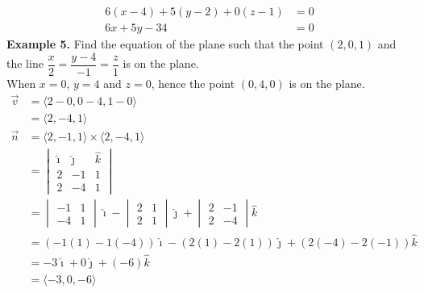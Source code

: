 \vspace{-3.5em}
\begin{align*}
    6(x - 4) + 5(y - 2) + 0(z - 1) & = 0 \\
    6x + 5y - 34                   & = 0
\end{align*}
\noindent\textbf{Example 5. } Find the equation of the plane such that the point $(2, 0, 1)$ and the line $\dfrac{x}{2} = \dfrac{y-4}{-1} = \dfrac{z}{1}$ is on the plane.
~\\
When $x = 0$, $y = 4$ and $z = 0$, hence the point $(0, 4, 0)$ is on the plane.
\begin{align*}
    \vec{v} & = \langle 2 - 0, 0 - 4, 1 - 0 \rangle                                              \\
            & = \langle 2, -4, 1 \rangle                                                         \\
    \vec{n} & = \langle 2, -1, 1 \rangle \times \langle 2, -4, 1 \rangle                         \\
            & = \begin{vmatrix}
                    \hat{\imath} & \hat{\jmath} & \hat{k} \\
                    2            & -1           & 1       \\
                    2            & -4           & 1
                \end{vmatrix}                        \\
            & = \begin{vmatrix}
                    -1 & 1 \\
                    -4 & 1
                \end{vmatrix}\hat{\imath} - \begin{vmatrix}
                                                2 & 1 \\
                                                2 & 1
                                            \end{vmatrix}\hat{\jmath} + \begin{vmatrix}
                                                                            2 & -1 \\
                                                                            2 & -4
                                                                        \end{vmatrix}\hat{k}     \\
            & = (-1(1) - 1(-4))\hat{\imath} - (2(1) - 2(1))\hat{\jmath} + (2(-4) - 2(-1))\hat{k} \\
            & = -3\hat{\imath} + 0\hat{\jmath} + (-6)\hat{k}                                     \\
            & = \langle -3, 0, -6 \rangle
\end{align*}
